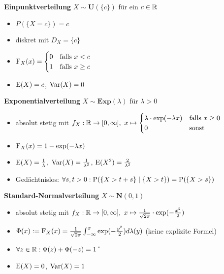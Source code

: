 \textbf{Einpunktverteilung} $X\sim\mathbf{U}(\{c\})$ für ein $c\in\R$
\begin{itemize}
\item $P(\{X=c\})=c$

\item diskret mit $D_X=\{c\}$

\item $\F_X(x)=\begin{cases}
0 	&\text{falls } x<c			\\
1	& \text{falls } x\geq c
\end{cases}$

\item $\E(X)=c$, $\Var(X)=0$
\end{itemize}

\textbf{Exponentialverteilung} $X\sim\mathbf{Exp}(\lambda)$ für $\lambda>0$
\begin{itemize}
\item absolut stetig mit
$f_X:\R\to [0,\infty],\ x\mapsto\begin{cases}
\lambda\cdot\exp(-\lambda x) 	& \text{falls } x\geq 0	\\
0							& \text{sonst }		
\end{cases}$

\item $\F_X(x)=1-\exp(-\lambda x)$

\item $\E(X)=\frac{1}{\lambda}$, $\Var(X)=\frac{1}{\lambda^2}$,
$\E(X^2)=\frac{2}{\lambda^2}$

\item Gedächtnislos: $\forall s,t>0:\P(\{X>t+s\}\mid\{X>t\})=\P(\{X>s\})$\\
\end{itemize}

\textbf{Standard-Normalverteilung} $X\sim\mathbf{N}(0,1)$
\begin{itemize}
\item absolut stetig mit $f_X:\R\to[0,\infty],\
x\mapsto\frac{1}{\sqrt{2\pi}}\cdot\exp(-\frac{x^2}{2})$

\item $\Phi(x):=\F_X(x)=
\frac{1}{\sqrt{2\pi}}\int_{-\infty}^{x}\exp(-\frac{y^2}{2})d\lambda(y)$
(keine explizite Formel)

\item $\forall z\in\R:\Phi(z)+\Phi(-z)=1$ \U

\item $\E(X)=0$, $\Var(X)=1$

\end{itemize}

